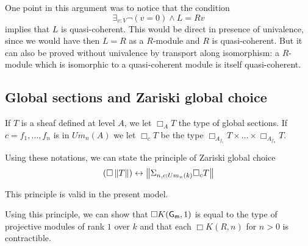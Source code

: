 One point in this argument was to notice that the condition
$$
\exists_{v:V}\neg (v = 0)\wedge L = R v
$$
implies that $L$ is quasi-coherent. This would be direct in presence of univalence, since we would have then $L = R$ as a $R$-module
and $R$ is quasi-coherent. But it can also be proved without univalence by transport along isomorphism: a $R$-module which is
isomorphic to a quasi-coherent module is itself quasi-coherent.


\subsection{Global sections and Zariski global choice}

If $T$ is a sheaf defined at level $A$, we let $\Box_A T$ the type of global sections.
If $c = f_1,\dots,f_n$ is in $Um_n(A)$ we let $\Box_c T$ be the type $\Box_{A_{f_1}}T\times\dots\times\Box_{A_{f_n}}T$.

Using these notations, we can state the principle of Zariski global choice
$$
(\Box \left\lVert T \right\rVert)\leftrightarrow \left\lVert \Sigma_{n,c:Um_n(k)}\Box_c T \right\rVert
$$

This principle is valid in the present model.

Using this principle, we can show that $\Box K(\mathsf{G_m},1)$ is equal to the type of projective modules of rank $1$ over $k$
and that each $\Box K(R,n)$ for $n>0$ is contractible.
                                                                                  

 
